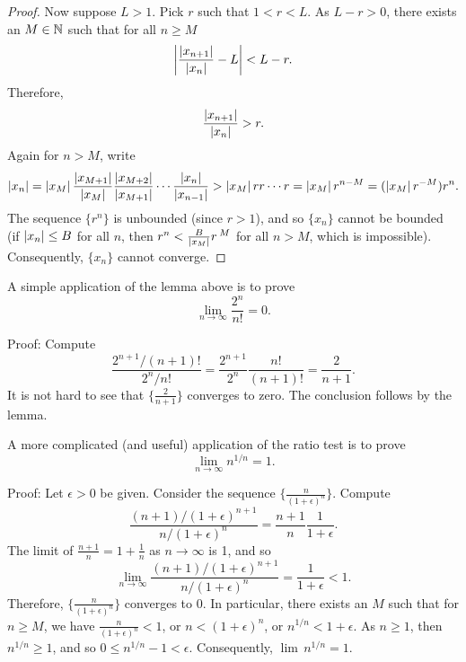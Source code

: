 \begin{proof}
Now suppose $L > 1$.  Pick
$r$ such that $1 < r < L$.  As $L-r > 0$,
there exists an $M \in {\mathbb{N}}$ such that for
all $n \geq M$
\begin{equation*}
\left\lvert {\frac{\left\lvert {x_{n+1}} \right\rvert}{\left\lvert {x_n} \right\rvert} - L} \right\rvert < L-r .
\end{equation*}
Therefore,
\begin{equation*}
\frac{\left\lvert {x_{n+1}} \right\rvert}{\left\lvert {x_n} \right\rvert} > r .
\end{equation*}
Again for $n > M$,
write
\begin{equation*}
\left\lvert {x_n} \right\rvert =
\left\lvert {x_M} \right\rvert
\frac{\left\lvert {x_{M+1}} \right\rvert}{\left\lvert {x_{M}} \right\rvert}
\frac{\left\lvert {x_{M+2}} \right\rvert}{\left\lvert {x_{M+1}} \right\rvert}
\cdots
\frac{\left\lvert {x_{n}} \right\rvert}{\left\lvert {x_{n-1}} \right\rvert}
>
\left\lvert {x_M} \right\rvert
r r \cdots r = \left\lvert {x_M} \right\rvert r^{n-M} = (\left\lvert {x_M} \right\rvert r^{-M}) r^n .
\end{equation*}
The sequence $\{ r^n \}$ is unbounded (since $r > 1$), and so
$\{x_n\}$ cannot be bounded (if $\left\lvert {x_n} \right\rvert \leq B$ for all $n$, then
$r^n < \frac{B}{\left\lvert {x_M} \right\rvert} r^{\:M}$ for all $n > M$, which is impossible).
Consequently, $\{ x_n \}$ cannot converge.
\end{proof}

\begin{example}
A simple application of the lemma above is to prove 
\begin{equation*}
\lim_{n\to\infty} \frac{2^n}{n!} = 0 .
\end{equation*}

Proof:
Compute
\begin{equation*}
\frac{2^{n+1} / (n+1)!}{2^n/n!}
=
\frac{2^{n+1}}{2^n}\frac{n!}{(n+1)!}
=
\frac{2}{n+1} .
\end{equation*}
It is not hard to see that $\bigl\{ \frac{2}{n+1} \bigr\}$ converges to zero.
The conclusion follows by the lemma.
\end{example}

\begin{example} \label{example:nto1overn}
A more complicated (and useful) application of the ratio test is to prove 
\begin{equation*}
\lim_{n\to\infty} n^{1/n} = 1 .
\end{equation*}

Proof:
Let $\epsilon > 0$ be given.  Consider the sequence
$\bigl\{ \frac{n}{{(1+\epsilon)}^n} \bigr\}$.  Compute
\begin{equation*}
\frac{(n+1)/{(1+\epsilon)}^{n+1}}{n/{(1+\epsilon)}^{n}}
=
\frac{n+1}{n} \frac{1}{1+\epsilon} .
\end{equation*}
The limit of $\frac{n+1}{n} = 1+\frac{1}{n}$ as $n \to \infty$ is 1, and so
\begin{equation*}
\lim_{n\to \infty} \frac{(n+1)/{(1+\epsilon)}^{n+1}}{n/{(1+\epsilon)}^{n}}
=
\frac{1}{1+\epsilon}  < 1 .
\end{equation*}
Therefore, $\bigl\{ \frac{n}{{(1+\epsilon)}^n} \bigr\}$ converges to 0.
In particular,
there exists an $M$ such that for $n \geq M$, we have
$\frac{n}{{(1+\epsilon)}^n} < 1$, or 
$n < {(1+\epsilon)}^n$, or 
$n^{1/n} < 1+\epsilon$.  As $n \geq 1$, then $n^{1/n} \geq 1$, and
so $0 \leq n^{1/n}-1 < \epsilon$. Consequently,
$\lim\, n^{1/n} = 1$.
\end{example}

